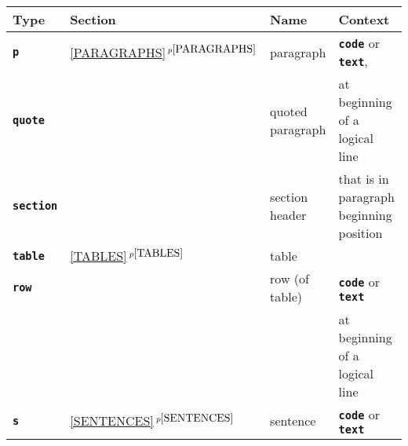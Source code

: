 \documentclass[12pt]{article}
\newcommand{\TT}[1]{{\tt \bfseries #1}}
\newcommand{\ttkey}[1]{{\tt \bfseries #1}}
\newcommand{\itemref}[1]{\ref{#1}$\,^{p\pageref{#1}}$}
\begin{document}
\begin{center}
\begin{tabular}{|l|l|l|l|}
\hline
\bf Type & \bf Section & \bf Name & \bf Context
\\\hline
\ttkey{p}	& \itemref{PARAGRAPHS} & paragraph
	& \TT{code} or \TT{text},
\\\cline{1-1}\cline{3-3}
\ttkey{quote}	& & quoted paragraph & at beginning of a logical line
\\\cline{1-1}\cline{3-3}
\ttkey{section}	& & section header & that is in paragraph beginning position
\\\cline{1-3}
\ttkey{table}	& \itemref{TABLES} & table &
\\\cline{1-1}\cline{3-4}
\ttkey{row}	& & row (of table) & \TT{code} or \TT{text} \\
		& &		   & at beginning of a logical line
\\\hline
\ttkey{s}	& \itemref{SENTENCES}& sentence & \TT{code} or \TT{text}
\\\hline
\end{tabular}
\end{center}
\end{document}
